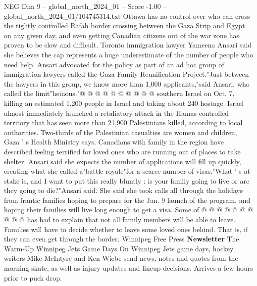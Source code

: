 \begin{textsample}{NEG Dim 9 – global\_north\_2024\_01 – Score -1.00 – global\_north\_2024\_01/104745314.txt}
Ottawa has no control over who can cross the tightly controlled Rafah border crossing between the Gaza Strip and Egypt on any given day, and even getting Canadian citizens out of the war zone has proven to be slow and difficult.
Toronto immigration lawyer Yameena Ansari said she believes the cap represents a huge underestimate of the number of people who need help.
Ansari advocated for the policy as part of an ad hoc group of immigration lawyers called the Gaza Family Reunification Project."Just between the lawyers in this group, we know more than 1,000 applicants,"said Ansari, who called the limit"heinous."@ @ @ @ @ @ @ @ @ @ southern Israel on Oct. 7, killing an estimated 1,200 people in Israel and taking about 240 hostage.
Israel almost immediately launched a retaliatory attack in the Hamas-controlled territory that has seen more than 21,900 Palestinians killed, according to local authorities.
Two-thirds of the Palestinian casualties are women and children, Gaza ' s Health Ministry says.
Canadians with family in the region have described feeling terrified for loved ones who are running out of places to take shelter.
Ansari said she expects the number of applications will fill up quickly, creating what she called a"battle royale"for a scarce number of visas."What ' s at stake is, and I want to put this really bluntly : is your family going to live or are they going to die?"Ansari said.
She said she took calls all through the holidays from frantic families hoping to prepare for the Jan. 9 launch of the program, and hoping their families will live long enough to get a visa.
Some of @ @ @ @ @ @ @ @ @ @ has had to explain that not all family members will be able to leave.
Families will have to decide whether to leave some loved ones behind.
That is, if they can even get through the border.
Winnipeg Free Press \textbf{Newsletter} The Warm-Up Winnipeg Jets Game Days On Winnipeg Jets game days, hockey writers Mike McIntyre and Ken Wiebe send news, notes and quotes from the morning skate, as well as injury updates and lineup decisions.
Arrives a few hours prior to puck drop.

\end{textsample}

